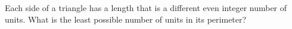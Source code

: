 Each side of a triangle has a length that is a different even integer number of units. What is the least possible number of units in its perimeter?
